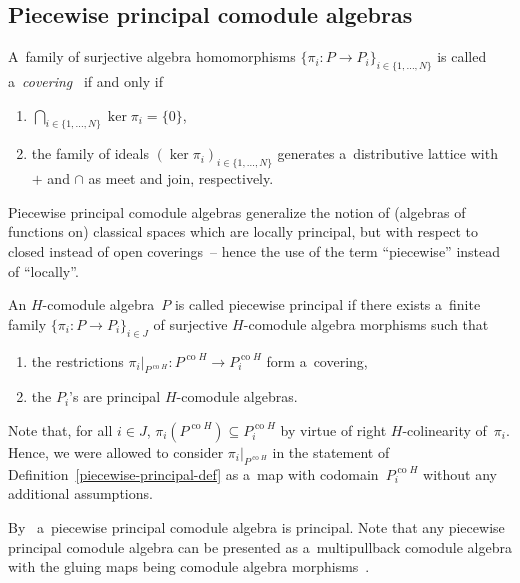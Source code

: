 \documentclass[11pt]{article}
\DeclareMathOperator{\co}{co}
\begin{document}
\subsection{Piecewise principal comodule algebras}

\begin{definition} A~family of surjective algebra homomorphisms  $\{\pi_i:P\rightarrow P_i\}_{i\in\{1,\ldots,N\}}$
is called a~{\em covering}~\cite{hkmz11} if and only if
\begin{enumerate}\itemsep=0pt
\item[1)] $\bigcap_{i\in\{1,\ldots,N\}}\ker\pi_i=\{0\}$,
\item[2)] the family of ideals $(\ker\pi_i)_{i\in\{1,\ldots,N\}}$ generates a~distributive lattice with $+$ and $\cap$ as
meet and join, respectively.
\end{enumerate}
\end{definition}

Piecewise principal comodule algebras generalize the notion of (algebras of functions on) classical spaces which are
locally principal, but with respect to closed instead of open coverings~-- hence the use of the term ``piecewise''
instead of ``locally''.

\begin{definition}\label{piecewise-principal-def}
An $H$-comodule algebra~$P$ is called piecewise principal if there exists a~f\/inite
family $\{\pi_i:P\rightarrow P_i\}_{i\in J}$ of surjective $H$-comodule algebra morphisms such that
\begin{enumerate}\itemsep=0pt
\item[1)] the restrictions $\pi_i\big|_{P^{\co H}}:P^{\co H}\rightarrow P^{\co H}_i$ form a~covering,
\item[2)] the $P_i$'s are principal $H$-comodule algebras.
\end{enumerate}
\end{definition}

Note that, for all $i\in J$, $\pi_i(P^{\co H})\subseteq P^{\co H}_i$ by virtue of right $H$-colinearity of~$\pi_i$.
Hence, we were allowed to consider $\pi_i\big|_{P^{\co H}}$ in the statement of
Def\/inition~\ref{piecewise-principal-def} as a~map with codomain~$P^{\co H}_i$ without any additional assumptions.

By~\cite[Corollary~3.9]{hkmz11} a~piecewise principal comodule algebra is principal.
Note that any piecewise principal comodule algebra can be presented as a~multipullback comodule algebra with the gluing
maps being comodule algebra morphisms~\cite{cm2002}.
\end{document}
